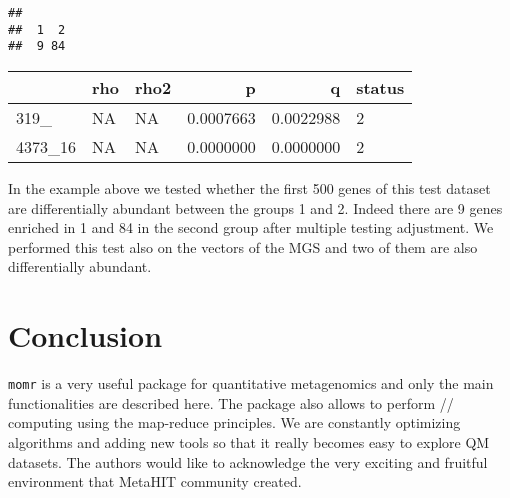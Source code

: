 \documentclass[]{article}
\newenvironment{Shaded}{\begin{snugshade}}{\end{snugshade}}
\newcommand{\KeywordTok}[1]{\textcolor[rgb]{0.13,0.29,0.53}{\textbf{{#1}}}}
\newcommand{\DataTypeTok}[1]{\textcolor[rgb]{0.13,0.29,0.53}{{#1}}}
\newcommand{\FloatTok}[1]{\textcolor[rgb]{0.00,0.00,0.81}{{#1}}}
\newcommand{\StringTok}[1]{\textcolor[rgb]{0.31,0.60,0.02}{{#1}}}
\newcommand{\CommentTok}[1]{\textcolor[rgb]{0.56,0.35,0.01}{\textit{{#1}}}}
\newcommand{\NormalTok}[1]{{#1}}
\begin{document}
\begin{Shaded}
\end{Shaded}

\begin{verbatim}
## 
##  1  2 
##  9 84
\end{verbatim}

\begin{Shaded}
\end{Shaded}

\begin{longtable}[c]{@{}lllrrl@{}}
\toprule
& rho & rho2 & p & q & status\tabularnewline
\midrule
\endhead
319\_ & NA & NA & 0.0007663 & 0.0022988 & 2\tabularnewline
4373\_16 & NA & NA & 0.0000000 & 0.0000000 & 2\tabularnewline
\bottomrule
\end{longtable}

In the example above we tested whether the first 500 genes of this test
dataset are differentially abundant between the groups 1 and 2. Indeed
there are 9 genes enriched in 1 and 84 in the second group after
multiple testing adjustment. We performed this test also on the vectors
of the MGS and two of them are also differentially abundant.

\section{Conclusion}\label{conclusion}

\texttt{momr} is a very useful package for quantitative metagenomics and
only the main functionalities are described here. The package also
allows to perform // computing using the map-reduce principles. We are
constantly optimizing algorithms and adding new tools so that it really
becomes easy to explore QM datasets. The authors would like to
acknowledge the very exciting and fruitful environment that MetaHIT
community created.
\end{document}
